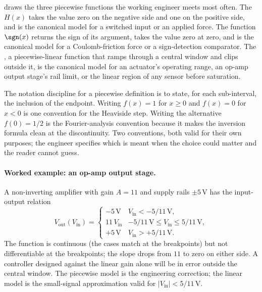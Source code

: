 

 draws the three piecewise
functions the working engineer meets most often. The
 $H(x)$ takes the value zero on the negative
side and one on the positive side, and is the canonical model for a
switched input or an applied force. The  function
$\sgn(x)$ returns the sign of its argument, takes the value zero at
zero, and is the canonical model for a Coulomb-friction force or a
sign-detection comparator. The , a
piecewise-linear function that ramps through a central window and
clips outside it, is the canonical model for an actuator's
operating range, an op-amp output stage's rail limit, or the
linear region of any sensor before saturation.

The notation discipline for a piecewise definition is to state, for
each sub-interval, the inclusion of the endpoint. Writing
$f(x) = 1$ for $x \geq 0$ and $f(x) = 0$ for $x < 0$ is one
convention for the Heaviside step. Writing the alternative
$f(0) = 1/2$ is the Fourier-analysis convention because it makes
the inversion formula clean at the discontinuity. Two conventions,
both valid for their own purposes; the engineer specifies which is
meant when the choice could matter and the reader cannot guess.

\paragraph{Worked example: an op-amp output stage.}
A non-inverting amplifier with gain $A = 11$ and supply rails
$\pm 5\,\si{\volt}$ has the input-output relation
\[
  V_{\text{out}}(V_{\text{in}}) = \begin{cases}
    -5\,\si{\volt} & V_{\text{in}} < -5/11\,\si{\volt}, \\
    11\,V_{\text{in}} & -5/11\,\si{\volt} \leq V_{\text{in}}
      \leq 5/11\,\si{\volt}, \\
    +5\,\si{\volt} & V_{\text{in}} > +5/11\,\si{\volt}.
  \end{cases}
\]
The function is continuous (the cases match at the breakpoints)
but not differentiable at the breakpoints; the slope drops from
$11$ to zero on either side. A controller designed against the
linear gain alone will be in error outside the central window. The
piecewise model is the engineering correction; the linear model is
the small-signal approximation valid for $|V_{\text{in}}| < 5/11\,
\si{\volt}$.

